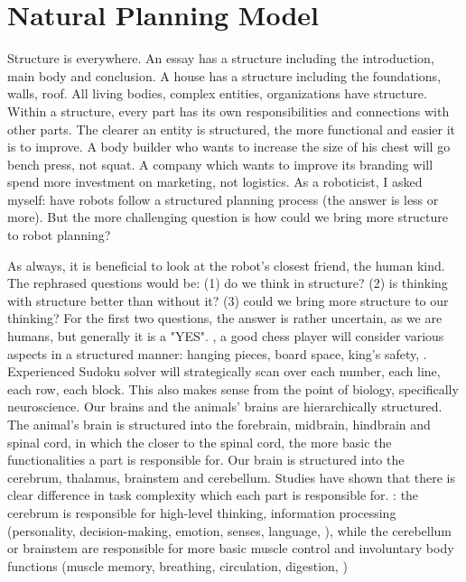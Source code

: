 \chapter{Natural Planning Model}
Structure is everywhere. An essay has a structure including the introduction, main body and conclusion. A house has a structure including the foundations, walls, roof. All living bodies, complex entities, organizations have structure. Within a structure, every part has its own responsibilities and connections with other parts. The clearer an entity is structured, the more functional and easier it is to improve. A body builder who wants to increase the size of his chest will go bench press, not squat. A company which wants to improve its branding will spend more investment on marketing, not logistics. As a roboticist, I asked myself: have robots follow a structured planning process (the answer is less or more). But the more challenging question is how could we bring more structure to robot planning? 

As always, it is beneficial to look at the robot's closest friend, the human kind. The rephrased questions would be: (1) do we think in structure? (2) is thinking with structure better than without it? (3) could we bring more structure to our thinking? For the first two questions, the answer is rather uncertain, as we are humans, but generally it is a "YES". \Eg, a good chess player will consider various aspects in a structured manner: hanging pieces, board space, king's safety, \etc. Experienced Sudoku solver will strategically scan over each number, each line, each row, each block. This also makes sense from the point of biology, specifically neuroscience. Our brains and the animals' brains are hierarchically structured. The animal's brain is structured into the forebrain, midbrain, hindbrain and spinal cord, in which the closer to the spinal cord, the more basic the functionalities a part is responsible for. Our brain is structured into the cerebrum, thalamus, brainstem and cerebellum. Studies have shown that there is clear difference in task complexity which each part is responsible for. \Eg: the cerebrum is responsible for high-level thinking, information processing (personality, decision-making, emotion, senses, language, \etc), while the cerebellum or brainstem are responsible for more basic muscle control and involuntary body functions (muscle memory, breathing, circulation, digestion, \etc)

